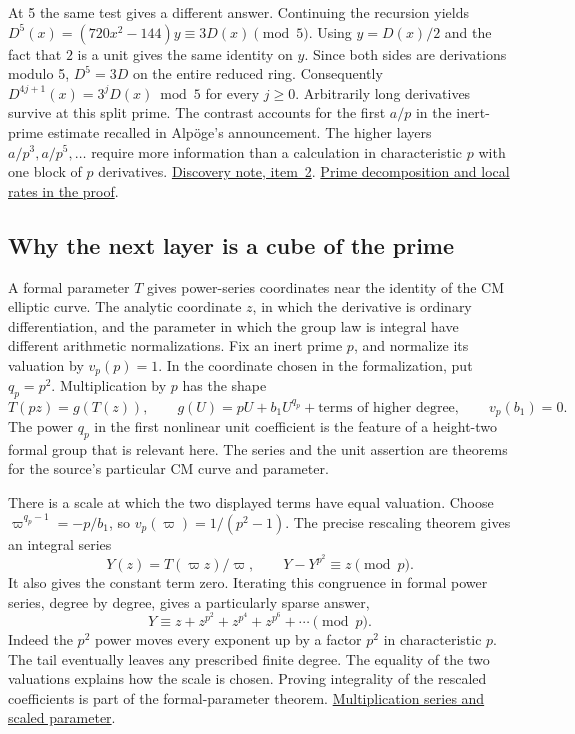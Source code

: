 \documentclass[11pt,letterpaper]{article}
\newcommand{\sref}[2]{\href{https://github.com/VladimirReshetnikov/ProveIt/blob/d8415e76ad850651f8c0083afe689dd9f4a45a10/Analysis/GeneralizedRiemannHypothesis/vendor/grh-lean/grh/src/#1.lean}{#2}}
\begin{document}
At 5 the same test gives a different answer. Continuing the recursion yields \(D^5(x)=(720x^2-144)y\equiv3D(x)\pmod5\). Using \(y=D(x)/2\) and the fact that \(2\) is a unit gives the same identity on \(y\). Since both sides are derivations modulo 5, \(D^5=3D\) on the entire reduced ring. Consequently \(D^{4j+1}(x)=3^jD(x)\bmod5\) for every \(j\ge0\). Arbitrarily long derivatives survive at this split prime. The contrast accounts for the first \(a/p\) in the inert-prime estimate recalled in Alpöge's announcement. The higher layers \(a/p^3,a/p^5,\ldots\) require more information than a calculation in characteristic \(p\) with one block of \(p\) derivatives. \href{https://alpo.ge/remark.pdf}{Discovery note, item~2}. \sref{Lib/CM/FormalGroup/PrimeNotation}{Prime decomposition and local rates in the proof}.

\subsection{Why the next layer is a cube of the prime}

A formal parameter \(T\) gives power-series coordinates near the identity of the CM elliptic curve. The analytic coordinate \(z\), in which the derivative is ordinary differentiation, and the parameter in which the group law is integral have different arithmetic normalizations. Fix an inert prime \(p\), and normalize its valuation by \(v_p(p)=1\). In the coordinate chosen in the formalization, put \(q_p=p^2\). Multiplication by \(p\) has the shape
\[
 T(pz)=g(T(z)),\qquad
 g(U)=pU+b_1U^{q_p}+\text{terms of higher degree},\qquad v_p(b_1)=0 .
\]
The power \(q_p\) in the first nonlinear unit coefficient is the feature of a height-two formal group that is relevant here. The series and the unit assertion are theorems for the source's particular CM curve and parameter.

There is a scale at which the two displayed terms have equal valuation. Choose \(\varpi^{q_p-1}=-p/b_1\), so \(v_p(\varpi)=1/(p^2-1)\). The precise rescaling theorem gives an integral series
\[
             Y(z)=T(\varpi z)/\varpi,\qquad
             Y-Y^{p^2}\equiv z\pmod p .
\]
It also gives the constant term zero. Iterating this congruence in formal power series, degree by degree, gives a particularly sparse answer,
\[
                Y\equiv z+z^{p^2}+z^{p^4}+z^{p^6}+\cdots\pmod p .
\]
Indeed the \(p^2\) power moves every exponent up by a factor \(p^2\) in characteristic \(p\). The tail eventually leaves any prescribed finite degree. The equality of the two valuations explains how the scale is chosen. Proving integrality of the rescaled coefficients is part of the formal-parameter theorem. \sref{Lib/CM/FormalGroup/FormalParameter}{Multiplication series and scaled parameter}.
\end{document}

